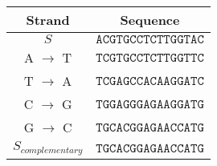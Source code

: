 \begin{center}

\begin{tabular}{|cc|}
\hline
\textbf{Strand} & \textbf{Sequence}\\
\hline\hline
$S$      & $\mathtt{ACGTGCCTCTTGGTAC}$ \\
\hline
A $\to$ T &  $\mathtt{TCGTGCCTCTTGGTTC}$ \\
T $\to$ A &  $\mathtt{TCGAGCCACAAGGATC}$ \\
C $\to$ G &  $\mathtt{TGGAGGGAGAAGGATG}$ \\
G $\to$ C &  $\mathtt{TGCACGGAGAACCATG}$ \\
\hline
$S_{complementary}$ &  $\mathtt{TGCACGGAGAACCATG}$ \\
\hline
\end{tabular}
\end{center}


